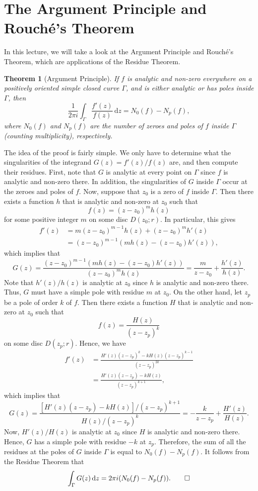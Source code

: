 \documentclass[10pt]{article}
\makeatletter
\newcommand{\dd}{\,\mathrm{d}}
\theoremstyle{newstyle}
\newtheorem{thm}{Theorem}[section]
\newenvironment{pf}[1][\proofname]{\par
  \pushQED{\qed}%
  \normalfont \topsep0\p@\relax
  \trivlist
  \item[\hskip\labelsep\scshape
  #1\@addpunct{.}]\ignorespaces
}{%
  \popQED\endtrivlist\@endpefalse
}
\makeatother
\begin{document}
\newpage 
\section{The Argument Principle and Rouch\'e's Theorem}

In this lecture, we will take a look at the Argument Principle and Rouch\'e's Theorem, which 
are applications of the Residue Theorem. 

\begin{thm}[Argument Principle]
If $f$ is analytic and non-zero everywhere on a positively oriented simple closed curve $\Gamma$,
and is either analytic or has poles inside $\Gamma$, then 
\[ \frac{1}{2\pi i} \int_\Gamma \frac{f'(z)}{f(z)}\dd z = N_0(f) - N_p(f), \]
where $N_0(f)$ and $N_p(f)$ are the number of zeroes and poles of $f$ inside $\Gamma$
(counting multiplicity), respectively. 
\end{thm}
\begin{pf}
The idea of the proof is fairly simple. We only have to determine what the singularities of the 
integrand $G(z) = f'(z)/f(z)$ are, and then compute their residues.
First, note that $G$ is analytic at every point on $\Gamma$ since $f$ is analytic and non-zero there. 
In addition, the singularities of $G$ inside $\Gamma$ occur at the zeroes and poles of $f$. 
Now, suppose that $z_0$ is a zero of $f$ inside $\Gamma$. Then there exists a function $h$ that 
is analytic and non-zero at $z_0$ such that 
\[ f(z) = (z-z_0)^m h(z) \]
for some positive integer $m$ on some disc $D(z_0; r)$. In particular, this gives 
\begin{align*}
    f'(z) &= m(z-z_0)^{m-1}h(z) + (z-z_0)^m h'(z) \\
    &= (z-z_0)^{m-1} (mh(z) - (z-z_0)h'(z)), 
\end{align*}
which implies that 
\[ G(z) = \frac{(z-z_0)^{m-1}(mh(z) - (z-z_0)h'(z))}{(z-z_0)^mh(z)} 
= \frac{m}{z-z_0} + \frac{h'(z)}{h(z)}. \]
Note that $h'(z)/h(z)$ is analytic at $z_0$ since $h$ is analytic and non-zero there. Thus, 
$G$ must have a simple pole with residue $m$ at $z_0$. On the other hand, let 
$z_p$ be a pole of order $k$ of $f$. Then there exists a function $H$ that is analytic and non-zero 
at $z_0$ such that 
\[ f(z) = \frac{H(z)}{(z-z_p)^k} \] 
on some disc $D(z_p; r)$. Hence, we have 
\begin{align*}
    f'(z) &= \frac{H'(z)(z-z_p)^k - kH(z)(z-z_p)^{k-1}}{(z-z_p)^{2k}} \\
    &= \frac{H'(z)(z-z_p) - kH(z)}{(z-z_p)^{k+1}}, 
\end{align*}
which implies that 
\[ G(z) = \frac{[H'(z)(z-z_p) - kH(z)]/(z-z_p)^{k+1}}{H(z)/(z-z_p)^k} = 
-\frac{k}{z-z_p} + \frac{H'(z)}{H(z)}. \]
Now, $H'(z)/H(z)$ is analytic at $z_0$ since $H$ is analytic and non-zero there. Hence, 
$G$ has a simple pole with residue $-k$ at $z_p$. Therefore, the sum of all the residues 
at the poles of $G$ inside $\Gamma$ is equal to $N_0(f) - N_p(f)$. It follows from the 
Residue Theorem that 
\[ \int_\Gamma G(z)\dd z = 2\pi i(N_0(f) - N_p(f)). \qedhere \]
\end{pf}
\end{document}
